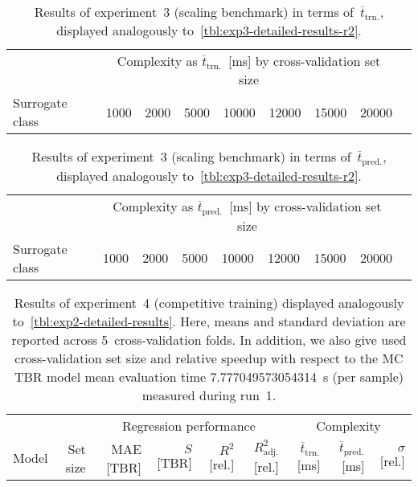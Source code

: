 \begin{table}[h]
	\centering
	{\footnotesize
		\begin{tabular}{lrrrrrrrr}
		\toprule
		{} & \multicolumn{7}{c}{Complexity as $\overline{t}_{\text{trn.}}$~[ms] by cross-validation set size}\\
		\cmidrule(lr){2-8}
		Surrogate class
						& \num{1000}
						& \num{2000}
						& \num{5000}
						& \num{10000}
						& \num{12000}
						& \num{15000}
						& \num{20000}\\
		\midrule
		
		\bottomrule
		\end{tabular}
	}
	\caption{Results of experiment~3 (scaling benchmark) in terms of~$\overline{t}_{\text{trn.}}$,
	displayed analogously to~\cref{tbl:exp3-detailed-results-r2}.}
	\label{tbl:exp3-detailed-results-t-train}
\end{table}


\begin{table}[h]
	\centering
	{\footnotesize
		\begin{tabular}{lrrrrrrrr}
		\toprule
		{} & \multicolumn{7}{c}{Complexity as $\overline{t}_{\text{pred.}}$~[ms] by cross-validation set size}\\
		\cmidrule(lr){2-8}
		Surrogate class
						& \num{1000}
						& \num{2000}
						& \num{5000}
						& \num{10000}
						& \num{12000}
						& \num{15000}
						& \num{20000}\\
		\midrule
		
		\bottomrule
		\end{tabular}
	}
	\caption{Results of experiment~3 (scaling benchmark) in terms of~$\overline{t}_{\text{pred.}}$,
	displayed analogously to~\cref{tbl:exp3-detailed-results-r2}.}
	\label{tbl:exp3-detailed-results-t-pred}
\end{table}


\begin{table}[h]
	\centering
	{\footnotesize
		\begin{tabular}{lrrrrrrrr}
		\toprule
		{} & {} & \multicolumn{4}{c}{Regression performance} &
		\multicolumn{3}{c}{Complexity}\\
		\cmidrule(lr){3-6}
		\cmidrule(lr){7-9}
		Model & Set size & MAE [TBR] & $S$ [TBR] & $R^2$ [rel.] & $R^2_{\text{adj.}}$ [rel.]
						& $\overline{t}_{\text{trn.}}$ [ms] &
		$\overline{t}_{\text{pred.}}$ [ms] & $\sigma$ [rel.]\\
		\midrule
		
		\bottomrule
		\end{tabular}
	}
	\caption{Results of experiment~4 (competitive training) displayed analogously
		to~\cref{tbl:exp2-detailed-results}. Here, means and standard deviation
		are reported across 5~cross-validation folds. In addition, we also give
		used cross-validation set size and relative speedup with respect to the
		MC TBR model mean evaluation time \SI{7.777049573054314}{\second} (per
		sample) measured during run~1.}
	\label{tbl:exp4-detailed-results}
\end{table}


